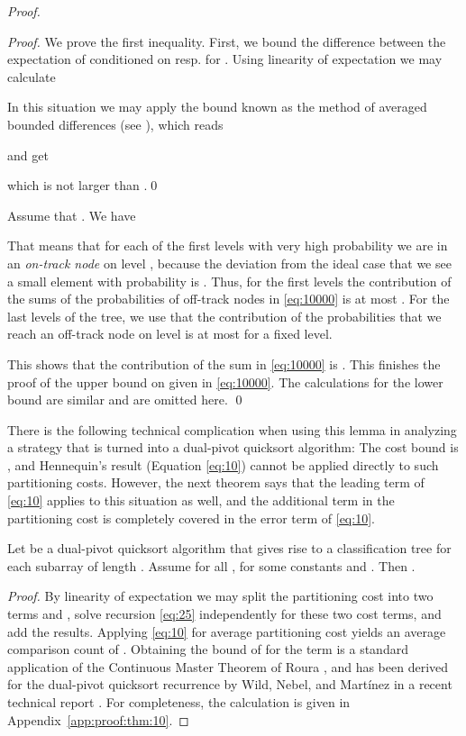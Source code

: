 \documentclass[prodmode,acmtalg]{acmsmall}
\begin{document}
\begin{proof}
\begin{proof}
    We prove the first inequality. 
    First, we bound the difference  between the expectation of
     conditioned on  resp.  for .
    Using linearity of expectation we may calculate 
    
In this situation we may apply the bound known as the method of averaged bounded differences (see
    \cite[Theorem 5.3]{dp09}), which reads
    
    and get 
    
    which is not larger than .\qed
\end{proof}

Assume that . We
have

That means that for each of the first  levels with very high
probability we are in an \emph{on-track node} on level , because the deviation from the ideal case
that we see a small element with probability  is . 
Thus, for the first 
levels the contribution of the sums
of the probabilities of off-track nodes in \eqref{eq:10000} is at most . For the last
 levels of the tree, we use that the contribution of the  probabilities
that we reach an off-track node on level  is at most  for a fixed level. 

This shows that the contribution of the sum in \eqref{eq:10000} is . This 
finishes the proof of the upper bound on  given in \eqref{eq:10000}.
The calculations for the lower bound are similar and are omitted here. \qed
\end{proof}
There is the following technical complication when using this lemma in analyzing a strategy 
that is turned into a dual-pivot quicksort algorithm:
The cost bound is , and  Hennequin's result (Equation \eqref{eq:10}) cannot be applied directly to such
partitioning costs. 
However, the next theorem says that the leading term of \eqref{eq:10} applies
to this situation as well, and the additional  term 
in the partitioning cost
is completely covered in the  error term of \eqref{eq:10}.
\begin{theorem}\label{thm:10}
Let  be a dual-pivot quicksort algorithm that gives rise to
a classification tree  for each subarray of length . Assume
 for all , for some constants  and . 
Then .
\end{theorem}
\begin{proof}
By linearity of expectation we may split the partitioning cost into two terms  and 
, solve recursion \eqref{eq:25} independently for these two
cost terms, and add the results. Applying \eqref{eq:10} for average partitioning cost  yields 
an average comparison count of . Obtaining the bound of  for the 
term   is a standard application
of the Continuous Master Theorem of Roura \cite{Roura01}, and has been derived for the dual-pivot
quicksort recurrence by Wild, Nebel, and Martínez in a recent technical report
\cite[Appendix D]{WildNM14}. For completeness, 
the calculation is given in Appendix~\ref{app:proof:thm:10}.
\end{proof}
\end{document}
